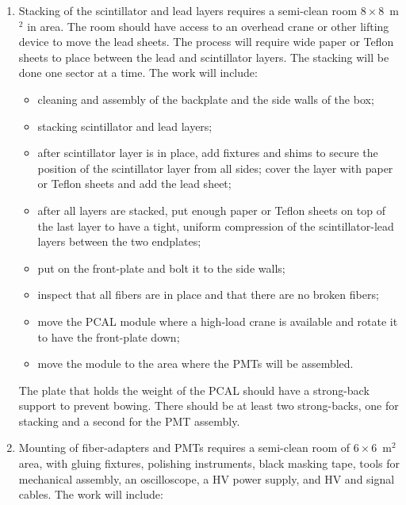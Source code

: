 \begin{enumerate}
\item Stacking of the scintillator and lead layers requires a semi-clean
room $8\times 8$~m$^2$ in area.  The room should have access to an overhead 
crane or other lifting device to move the lead sheets.  The process will 
require wide paper or Teflon sheets to place between the lead and scintillator
layers.  The stacking will be done one sector at a time.  The work will 
include:

  \begin{itemize}
    \item cleaning and assembly of the backplate and the side walls of 
          the box;
    \item stacking scintillator and lead layers;
    \item after scintillator layer is in place, add fixtures and shims to
          secure the position of the scintillator layer from all sides; 
          cover the layer with paper or Teflon sheets and add the lead sheet;
    \item after all layers are stacked, put enough paper or Teflon sheets
          on top of the last layer to have a tight, uniform compression of 
          the scintillator-lead layers between the two endplates;
    \item put on the front-plate and bolt it to the side walls;
    \item inspect that all fibers are in place and that there are no broken 
          fibers;
    \item move the PCAL module where a high-load crane is available and
          rotate it to have the front-plate down;
    \item move the module to the area where the PMTs will be assembled.
  \end{itemize}

\noindent
The plate that holds the weight of the PCAL should have a strong-back
support to prevent bowing.  There should be at least two strong-backs,
one for stacking and a second for the PMT assembly.

\item Mounting of fiber-adapters and PMTs requires a semi-clean room of
$6 \times 6$~m$^2$ area, with gluing fixtures, polishing instruments, 
black masking tape, tools for mechanical assembly, an oscilloscope, a HV 
power supply, and HV and signal cables.  The work will include:


\end{enumerate}
